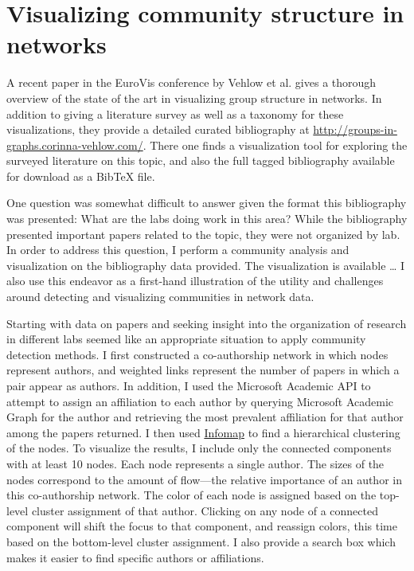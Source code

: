 \hypertarget{visualization}{\section{Visualizing community structure in
networks}\label{visualization}}

\protect\hyperlink{visualization}{}

A recent paper in the EuroVis conference by Vehlow et al.
\autocite{vehlow_state_2015} gives a thorough overview of the state of
the art in visualizing group structure in networks. In addition to
giving a literature survey as well as a taxonomy for these
visualizations, they provide a detailed curated bibliography at
\url{http://groups-in-graphs.corinna-vehlow.com/}. There one finds a
visualization tool for exploring the surveyed literature on this topic,
and also the full tagged bibliography available for download as a BibTeX
file.

One question was somewhat difficult to answer given the format this
bibliography was presented: What are the labs doing work in this area?
While the bibliography presented important papers related to the topic,
they were not organized by lab. In order to address this question, I
perform a community analysis and visualization on the bibliography data
provided. The visualization is available \ldots{} I also use this
endeavor as a first-hand illustration of the utility and challenges
around detecting and visualizing communities in network data.

Starting with data on papers and seeking insight into the organization
of research in different labs seemed like an appropriate situation to
apply community detection methods. I first constructed a co-authorship
network in which nodes represent authors, and weighted links represent
the number of papers in which a pair appear as authors. In addition, I
used the Microsoft Academic API  to attempt to assign an
affiliation to each author by querying Microsoft Academic Graph for the
author and retrieving the most prevalent affiliation for that author
among the papers returned. I then used
\protect\hyperlink{the-dynamical-perspective}{Infomap} to find a
hierarchical clustering of the nodes. To visualize the results, I
include only the connected components with at least 10 nodes. Each node
represents a single author. The sizes of the nodes correspond to the
amount of flow---the relative importance of an author in this
co-authorship network. The color of each node is assigned based on the
top-level cluster assignment of that author. Clicking on any node of a
connected component will shift the focus to that component, and reassign
colors, this time based on the bottom-level cluster assignment. I also
provide a search box which makes it easier to find specific authors or
affiliations.

